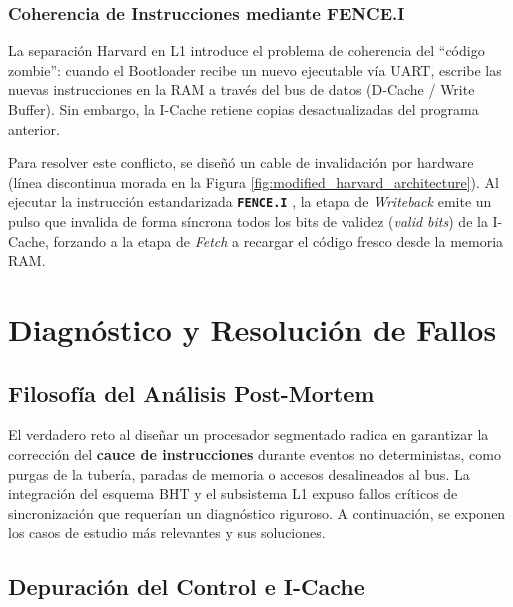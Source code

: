 \documentclass[10pt,a4paper]{article}
\begin{document}
\subsubsection{Coherencia de Instrucciones mediante FENCE.I}
La separación Harvard en L1 introduce el problema de coherencia del ``código zombie'': cuando el Bootloader recibe un nuevo ejecutable vía UART, escribe las
nuevas instrucciones en la RAM a través del bus de datos (D-Cache / Write Buffer). Sin embargo, la I-Cache retiene copias desactualizadas del programa anterior.

Para resolver este conflicto, se diseñó un cable de invalidación por hardware (línea discontinua morada en la Figura \ref{fig:modified_harvard_architecture}).
Al ejecutar la instrucción estandarizada \textbf{\texttt{FENCE.I}} \cite{riscv_spec}, la etapa de \textit{Writeback} emite un pulso que invalida de forma síncrona 
todos los bits de validez (\textit{valid bits}) de la I-Cache, forzando a la etapa de \textit{Fetch} a recargar el código fresco desde la memoria RAM.


\section{Diagnóstico y Resolución de Fallos}

\subsection{Filosofía del Análisis Post-Mortem}
El verdadero reto al diseñar un procesador segmentado radica en garantizar la corrección del \textbf{cauce de instrucciones} durante eventos no deterministas, como 
purgas de la tubería, paradas de memoria o accesos desalineados al bus. La integración del esquema BHT y el subsistema L1 expuso fallos críticos de 
sincronización que requerían un diagnóstico riguroso. A continuación, se exponen los casos de estudio más relevantes y sus soluciones.

\subsection{Depuración del Control e I-Cache}
\end{document}
